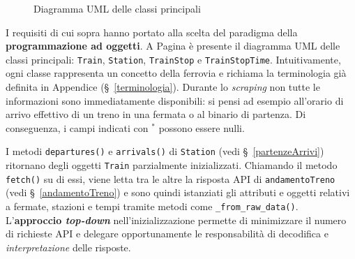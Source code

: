 \documentclass[12pt,a4paper,italian]{report}
\begin{document}
{\begin{landscape}
\begin{figure}[h]
            \caption{Diagramma UML delle classi principali}
            \vfill
        \end{figure}
    \end{landscape}
    \restoregeometry }

I requisiti di cui sopra hanno portato alla scelta del paradigma della
\textbf{programmazione ad oggetti}.  A Pagina \pageref{uml_classi} è
presente il diagramma UML delle classi principali: \texttt{Train},
\texttt{Station}, \texttt{TrainStop} e \texttt{TrainStopTime}.
Intuitivamente, ogni classe rappresenta un concetto della ferrovia e
richiama la terminologia già definita in Appendice
(\S~\ref{terminologia}).  Durante lo \textit{scraping} non tutte le
informazioni sono immediatamente disponibili: si pensi ad esempio
all'orario di arrivo effettivo di un treno in una fermata o al binario
di partenza.  Di conseguenza, i campi indicati con $^*$ possono essere
nulli.

I metodi \texttt{departures()} e \texttt{arrivals()} di
\texttt{Station} (vedi \S~\ref{partenzeArrivi}) ritornano degli
oggetti \texttt{Train} parzialmente inizializzati.  Chiamando il
metodo \texttt{fetch()} su di essi, viene letta tra le altre la
risposta API di \texttt{andamentoTreno} (vedi \S~\ref{andamentoTreno})
e sono quindi istanziati gli attributi e oggetti relativi a fermate,
stazioni e tempi tramite metodi come \texttt{\_from\_raw\_data()}.
L'\textbf{approccio \textit{top-down}} nell'inizializzazione permette
di minimizzare il numero di richieste API e delegare opportunamente le
responsabilità di decodifica e \textit{interpretazione} delle
risposte.
\end{document}
